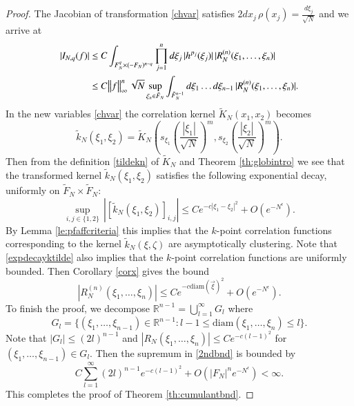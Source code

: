 \documentclass[11pt,reqno]{amsproc}
\numberwithin{equation}{section}
\numberwithin{theorem}{section}
\begin{document}
\begin{proof}
 The Jacobian of transformation \eqref{chvar} satisfies $2dx_{j}\,\rho(x_j) = \frac{d\xi_{j}}{\sqrt{N}}$ and we arrive at
\begin{align}
|I_{N,q}(f)| &\leq C\int_{F_{N}^{q}\times (-F_{N})^{n-q}}\prod_{j=1}^{n}d\xi_{j}\,|h^{p_j}(\xi_{j})|\,|R^{(n)}_{N}(\xi_1,\ldots,\xi_n)|\\
&\leq C\norm{f}_{\infty}^{n}\sqrt{N}\sup_{\xi_{n} \in \tilde{F}_{N}}\int_{\tilde{F}_{N}^{n-1}}d\xi_{1}\ldots d\xi_{n-1}\,|R^{(n)}_{N}(\xi_1,\ldots,\xi_n)|. \label{2ndbnd}
\end{align}
In the new variables \eqref{chvar} the correlation kernel $\tilde{K}_{N}(x_1,x_2)$ becomes
\begin{equation}
\tilde{k}_{N}(\xi_1,\xi_2) = \tilde{K}_{N}\left(s_{\xi_1}\left(\frac{|\xi_{1}|}{\sqrt{N}}\right)^{m},s_{\xi_2}\left(\frac{|\xi_{2}|}{\sqrt{N}}\right)^{m}\right).
\end{equation}
Then from the definition \eqref{tildekn} of $\tilde{K}_{N}$ and Theorem \ref{th:globintro} we see that the transformed kernel $\tilde{k}_{N}(\xi_1,\xi_2)$ satisfies the following exponential decay, uniformly on $\tilde{F}_{N} \times \tilde{F}_{N}$:
\begin{equation}
\sup_{i,j \in \{1,2\}}\,|[\tilde{k}_{N}(\xi_1,\xi_2)]_{i,j}| \leq Ce^{-c|\xi_1-\xi_2|^{2}} + O(e^{-N^{\epsilon}}). \label{expdecayktilde}
\end{equation}
By Lemma \ref{le:pfaffcriteria} this implies that the $k$-point correlation functions corresponding to the kernel $\tilde{k}_{N}(\xi,\zeta)$ are asymptotically clustering. Note that \eqref{expdecayktilde} also implies that the $k$-point correlation functions are uniformly bounded. Then Corollary \ref{corx} gives the bound
\begin{equation}
|R^{(n)}_{N}(\xi_1,\ldots,\xi_n)| \leq Ce^{-c\mathrm{diam}(\vec{\xi})^{2}} + O(e^{-N^{\epsilon}})\label{diambnd}.
\end{equation}
To finish the proof, we decompose $\mathbb{R}^{n-1} = \bigcup_{l=1}^{\infty}G_{l}$ where
\begin{equation}
G_{l} = \bigg\{(\xi_1,\ldots,\xi_{n-1}) \in \mathbb{R}^{n-1} : l-1 \leq \mathrm{diam}(\xi_1,\ldots,\xi_{n}) \leq l\bigg\}.
\end{equation}
Note that $|G_{l}| \leq (2l)^{n-1}$ and $|R_{N}(\xi_1,\ldots,\xi_{n})| \leq Ce^{-c(l-1)^{2}}$ for $(\xi_1,\ldots,\xi_{n-1}) \in G_{l}$. Then the supremum in \eqref{2ndbnd} is bounded by
\begin{equation}
C\sum_{l=1}^{\infty}(2l)^{n-1}e^{-c(l-1)^{2}} + O(|F_{N}|^{n}e^{-N^{\epsilon}}) < \infty.
\end{equation}
This completes the proof of Theorem \ref{th:cumulantbnd}.
\end{proof}
\end{document}
